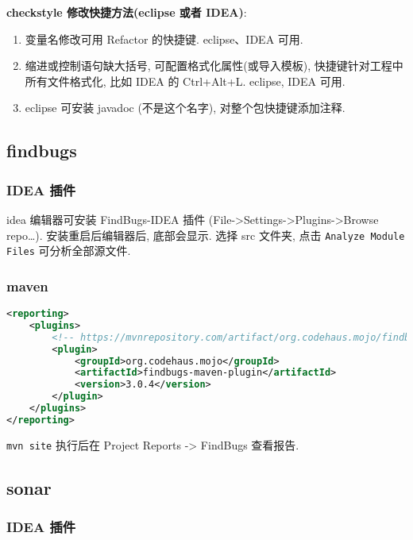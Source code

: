 \textbf{checkstyle 修改快捷方法(eclipse 或者 IDEA)}:

\begin{enumerate}
\def\labelenumi{\arabic{enumi}.}
\tightlist
\item
  变量名修改可用 Refactor 的快捷键. eclipse、IDEA 可用.
\item
  缩进或控制语句缺大括号, 可配置格式化属性(或导入模板),
  快捷键针对工程中所有文件格式化, 比如 IDEA 的 Ctrl+Alt+L. eclipse, IDEA
  可用.
\item
  eclipse 可安装 javadoc (不是这个名字), 对整个包快捷键添加注释.
\end{enumerate}

\subsection{findbugs}\label{findbugs}

\subsubsection{IDEA 插件}\label{idea-ux63d2ux4ef6}

idea 编辑器可安装 FindBugs-IDEA 插件
(File-\textgreater{}Settings-\textgreater{}Plugins-\textgreater{}Browse
repo\ldots{}). 安装重启后编辑器后, 底部会显示. 选择 src 文件夹, 点击
\lstinline!Analyze Module Files! 可分析全部源文件.

\subsubsection{maven}\label{maven-1}

\begin{lstlisting}[language=XML]
<reporting>
    <plugins>
        <!-- https://mvnrepository.com/artifact/org.codehaus.mojo/findbugs-maven-plugin -->
        <plugin>
            <groupId>org.codehaus.mojo</groupId>
            <artifactId>findbugs-maven-plugin</artifactId>
            <version>3.0.4</version>
        </plugin>
    </plugins>
</reporting>
\end{lstlisting}

\lstinline!mvn site! 执行后在 Project Reports -\textgreater{} FindBugs
查看报告.

\subsection{sonar}\label{sonar}

\subsubsection{IDEA 插件}\label{idea-ux63d2ux4ef6-1}

